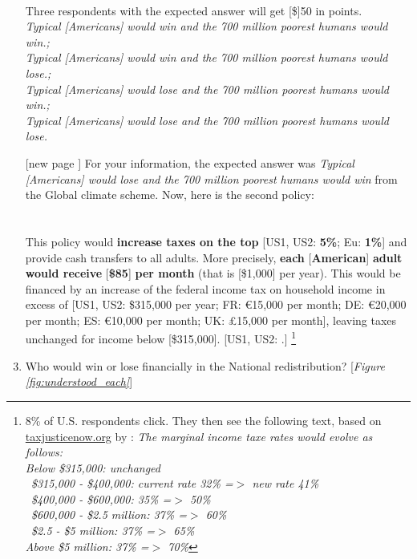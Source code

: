 \begin{enumerate}[resume]
\\
Three respondents with the expected answer will get [\$]50 in points.
\\ \textit{Typical [Americans] would win and the 700 million poorest humans would win.; \\Typical [Americans] would win and the 700 million poorest humans would lose.; \\Typical [Americans] would lose and the 700 million poorest humans would win.; \\Typical [Americans] would lose and the 700 million poorest humans would lose.}
\item[[new page\!\!\!]] For your information, the expected answer was \textit{Typical [Americans] would lose and the 700 million poorest humans would win} from the Global climate scheme. Now, here is the second policy: \\ 
\\
\textbf{}\\ This policy would \textbf{increase taxes on the top} [US1, US2: \textbf{5\%}; 
Eu: \textbf{1\%}] and provide cash transfers to all adults. More precisely, \textbf{each }[\textbf{American}]\textbf{ adult would receive }[\textbf{\$85}]\textbf{ per month} (that is [\$1,000] per year). 
This would be financed by an increase of the federal income tax on household income in excess of [US1, US2: \$315,000 per year; FR: \euro{}15,000 per month; DE: \euro{}20,000 per month; ES: \euro{}10,000 per month; UK: £15,000 per month], leaving taxes unchanged for income below [\$315,000]. [US1, US2: .]
\footnote{8\% of U.S. respondents click. They then see the following text, based on \href{https://taxjusticenow.org/\#makeYourOwnTaxPlan}{taxjusticenow.org} by \citet{saez_triumph_2019}: \textit{The marginal income taxe rates would evolve as follows:\\Below \$315,000: unchanged \\ ~\$315,000 - \$400,000: current rate 32\% =$>$ new rate 41\% \\ ~\$400,000 - \$600,000: 35\% =$>$ 50\% \\ ~\$600,000 - \$2.5 million: 37\% =$>$ 60\% \\ ~\$2.5 - \$5 million: 37\% =$>$ 65\% \\ Above \$5 million: 37\% =$>$ 70\%}}
\item \label{q:understood_nr} Who would win or lose financially in the National redistribution? [\textit{Figure \ref{fig:understood_each}}] ~\\

\end{enumerate}
